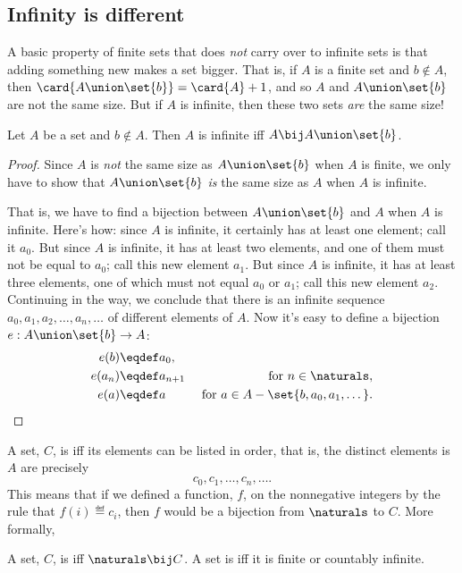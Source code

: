 \subsection{Infinity is different}

A basic property of finite sets that does \emph{not} carry over to
infinite sets is that adding something new makes a set bigger.  That is,
if $A$ is a finite set and $b \notin A$, then $\card{A \union \set{b}} =
\card{A}+1$, and so $A$ and $A \union \set{b}$ are not the same size.  But
if $A$ is infinite, then these two sets \emph{are} the same size!

\begin{lemma}\label{AUb}
  Let $A$ be a set and $b \notin A$.  Then $A$ is infinite iff $A \bij A
  \union \set{b}$.
\end{lemma}
\begin{proof}
  Since $A$ is \emph{not} the same size as $A \union \set{b}$ when $A$ is
  finite, we only have to show that $A \union \set{b}$ \emph{is} the same
  size as $A$ when $A$ is infinite.

That is, we have to find a bijection between $A \union \set{b}$ and $A$
when $A$ is infinite.  Here's how: since $A$ is infinite, it certainly has
at least one element; call it $a_0$.  But since $A$ is infinite, it has at
least two elements, and one of them must not be equal to $a_0$; call this
new element $a_1$.  But since $A$ is infinite, it has at least three
elements, one of which must not equal $a_0$ or $a_1$; call this new
element $a_2$.  Continuing in the way, we conclude that there is an
infinite sequence $a_0,a_1,a_2,\dots,a_n,\dots$ of different elements of
$A$.  Now it's easy to define a bijection $e: A \union \set{b} \to A$:
\begin{align*}
e(b) & \eqdef a_0,\\
e(a_n) & \eqdef a_{n+1}  &\text{ for } n \in \naturals,\\
e(a) & \eqdef a & \text{ for } a \in A - \set{b,a_0,a_1,\dots}.
\end{align*}
\end{proof}

A set, $C$, is  iff its elements can be listed in order,
that is, the distinct elements is $A$ are precisely
\[
c_0, c_1, \dots, c_n, \dots.
\]
This means that if we defined a function, $f$, on the nonnegative integers
by the rule that $f(i) \eqdef c_i$, then $f$ would be a bijection from
$\naturals$ to $C$.  More formally,

\begin{definition}
  A set, $C$, is  iff $\naturals \bij C$.  A set
  is  iff it is finite or countably infinite.
\end{definition}

